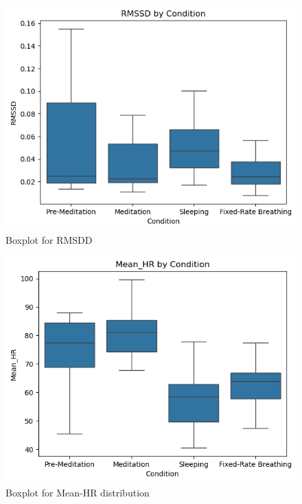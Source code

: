 \documentclass[
  11pt,
]{ieee}
\begin{document}
\begin{figure}

{\centering \includegraphics{picture_use_ml/5_Boxplots of HRV Metrics by Condition_RMSDD.png}

}

\caption{Boxplot for RMSDD}

\end{figure}%
\begin{figure}

{\centering \includegraphics{picture_use_ml/6_Boxplots of HRV Metrics by Condition_Mean_Hr.png}

}

\caption{Boxplot for Mean-HR distribution}

\end{figure}%
\end{document}

